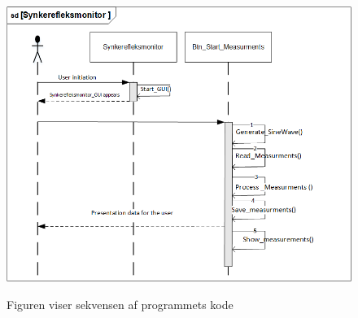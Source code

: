 \begin{figure}[H]
\centering
{\includegraphics[width=\linewidth]
{Figure/SekevensDiagram}}
\caption{Figuren viser sekvensen af programmets kode}
\label{Fig:SekevensDiagram}
\end{figure} 







